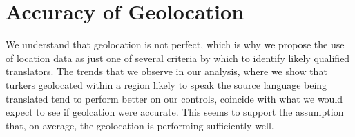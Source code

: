 \documentclass[11pt]{article}
\begin{document}
\section{Accuracy of Geolocation}

We understand that geolocation is not perfect, which is why we propose the use of location data as just one of several criteria by which to identify likely qualified translators. The trends that we observe in our analysis, where we show that turkers geolocated within a region likely to speak the source language being translated tend to perform better on our controls, coincide with what we would expect to see if geolcation were accurate. This seems to support the assumption that, on average, the geolocation is performing sufficiently well.
\end{document}
